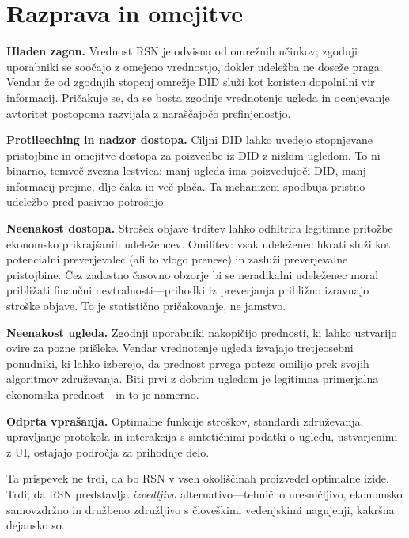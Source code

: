 \documentclass[11pt,a4paper,twocolumn]{article}
\begin{document}
\section{Razprava in omejitve}

\textbf{Hladen zagon.} Vrednost RSN je odvisna od omrežnih učinkov; zgodnji uporabniki se soočajo z omejeno vrednostjo, dokler udeležba ne doseže praga. Vendar že od zgodnjih stopenj omrežje DID služi kot koristen dopolnilni vir informacij. Pričakuje se, da se bosta zgodnje vrednotenje ugleda in ocenjevanje avtoritet postopoma razvijala z naraščajočo prefinjenostjo.

\textbf{Protileeching in nadzor dostopa.} Ciljni DID lahko uvedejo stopnjevane pristojbine in omejitve dostopa za poizvedbe iz DID z nizkim ugledom. To ni binarno, temveč zvezna lestvica: manj ugleda ima poizvedujoči DID, manj informacij prejme, dlje čaka in več plača. Ta mehanizem spodbuja pristno udeležbo pred pasivno potrošnjo.

\textbf{Neenakost dostopa.} Strošek objave trditev lahko odfiltrira legitimne pritožbe ekonomsko prikrajšanih udeležencev. Omilitev: vsak udeleženec hkrati služi kot potencialni preverjevalec (ali to vlogo prenese) in zasluži preverjevalne pristojbine. Čez zadostno časovno obzorje bi se neradikalni udeleženec moral približati finančni nevtralnosti---prihodki iz preverjanja približno izravnajo stroške objave. To je statistično pričakovanje, ne jamstvo.

\textbf{Neenakost ugleda.} Zgodnji uporabniki nakopičijo prednosti, ki lahko ustvarijo ovire za pozne prišleke. Vendar vrednotenje ugleda izvajajo tretjeosebni ponudniki, ki lahko izberejo, da prednost prvega poteze omilijo prek svojih algoritmov združevanja. Biti prvi z dobrim ugledom je legitimna primerjalna ekonomska prednost---in to je namerno.

\textbf{Odprta vprašanja.} Optimalne funkcije stroškov, standardi združevanja, upravljanje protokola in interakcija s sintetičnimi podatki o ugledu, ustvarjenimi z UI, ostajajo področja za prihodnje delo.

Ta prispevek ne trdi, da bo RSN v vseh okoliščinah proizvedel optimalne izide. Trdi, da RSN predstavlja \emph{izvedljivo} alternativo---tehnično uresničljivo, ekonomsko samovzdržno in družbeno združljivo s človeškimi vedenjskimi nagnjenji, kakršna dejansko so.

\end{document}
